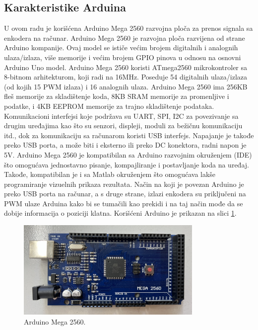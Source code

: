 \documentclass[a4paper, 12pt, diplomski]{etf}
\begin{document}
\subsection{Karakteristike Arduina}

U ovom radu je korišćena Arduino Mega 2560 razvojna ploča za prenos signala sa enkodera na računar. Arduino Mega 2560 je razvojna ploča razvijena od strane Arduino kompanije. Ovaj model se ističe većim brojem digitalnih i analognih ulaza/izlaza, više memorije i većim brojem GPIO pinova u odnosu na osnovni Arduino Uno model. Arduino Mega 2560 koristi ATmega2560 mikrokontroler sa 8-bitnom arhitekturom, koji radi na 16MHz. Poseduje 54 digitalnih ulaza/izlaza (od kojih 15 PWM izlaza) i 16 analognih ulaza. Arduino Mega 2560 ima 256KB fleš memorije za skladištenje koda, 8KB SRAM memorije za promenljive i podatke, i 4KB EEPROM memorije za trajno skladištenje podataka. Komunikacioni interfejsi koje podržava su UART, SPI, I2C za povezivanje sa drugim uređajima kao što su senzori, displeji, moduli za bežičnu komunikaciju itd., dok za komunikaciju sa računarom koristi USB interfejs. Napajanje je takođe preko USB porta, a može biti i eksterno ili preko DC konektora, radni napon je 5V. Arduino Mega 2560 je kompatibilan sa Arduino razvojnim okruženjem (IDE) što omogućava jednostavno pisanje, kompajliranje i postavljanje koda na uređaj. Takođe, kompatibilan je i sa Matlab okruženjem što omogućava lakše programiranje vizuelnih prikaza rezultata. Način na koji je povezan Arduino je preko USB porta na računar, a s druge strane, izlazi enkodera su priključeni na PWM ulaze Arduina kako bi se tumačili kao prekidi i na taj način mođe da se dobije informacija o poziciji klatna. Korišćeni Arduino je prikazan na slici \ref{mega2560}.


\begin{figure}[h!]
    \centering
    \includegraphics[width=0.8\textwidth]{imgs_real/mega2560_2.jpeg}
    \caption{Arduino Mega 2560.}
    \label{mega2560}
\end{figure}
\end{document}
